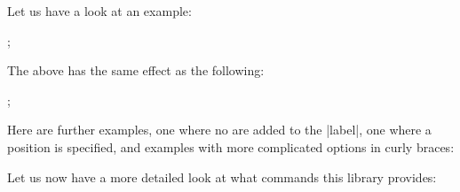 Let us have a look at an example:
%
\begin{codeexample}[preamble={\usetikzlibrary{quotes}}]
\tikz {};
\end{codeexample}
%
The above has the same effect as the following:
%
\begin{codeexample}[]
\tikz {};
\end{codeexample}

Here are further examples, one where no  are added to the
|label|, one where a position is specified, and examples with more complicated
options in curly braces:
%
\begin{codeexample}[preamble={\usetikzlibrary{quotes}}]
\end{codeexample}

Let us now have a more detailed look at what commands this library
provides:

